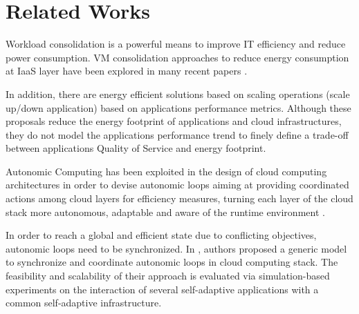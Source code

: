 \section{Related Works}
\label{sec: relworks}

Workload consolidation is a powerful means to improve IT efficiency and reduce power consumption.
VM consolidation approaches to reduce energy consumption at IaaS layer have been explored in many recent papers \cite{Cardosa} \cite{ITProf1} \cite{Schroder} \cite{Hermenier2009} \cite{sheikhalishahi_energy_2011} \cite{sheikhalishahi_multi-capacity_2014} \cite{dupont2015plug4green}.


In addition, there are energy efficient solutions based on scaling operations (scale up/down application) based on applications performance metrics.
Although these proposals reduce the energy footprint of applications and cloud infrastructures, they do not model the applications performance trend to finely define a trade-off between applications Quality of Service and energy footprint.

Autonomic Computing has been exploited in the design of cloud computing architectures in order to devise autonomic loops aiming at providing coordinated actions among cloud layers for efficiency measures, turning each layer of the cloud stack more autonomous, adaptable and aware of the runtime environment \cite{alvares_de_oliveira_synchronization_2012} \cite{de_oliveira_self-management_2012}  \cite{de_oliveira_framework_2013}.

In order to reach a global and efficient state due to conflicting objectives, autonomic loops need to be synchronized.
In \cite{alvares_de_oliveira_synchronization_2012}, authors proposed a generic model to synchronize and coordinate autonomic loops in cloud computing stack. 
The feasibility and scalability of their approach is evaluated via simulation-based experiments on the interaction of several self-adaptive applications with a common self-adaptive infrastructure.


